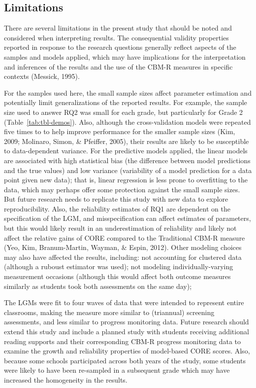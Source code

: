 \documentclass[
  english,
  man, fleqn, noextraspace]{apa6}
\begin{document}
\hypertarget{limitations}{%
\subsection{Limitations}\label{limitations}}

There are several limitations in the present study that should be noted and considered when interpreting results. The consequential validity properties reported in response to the research questions generally reflect aspects of the samples and models applied, which may have implications for the interpretation and inferences of the results and the use of the CBM-R measures in specific contexts (Messick, 1995).

For the samples used here, the small sample sizes affect parameter estimation and potentially limit generalizations of the reported results. For example, the sample size used to answer RQ2 was small for each grade, but particularly for Grade 2 (Table~\ref{tab:tbl-demos}). Also, although the cross-validation models were repeated five times to to help improve performance for the smaller sample sizes (Kim, 2009; Molinaro, Simon, \& Pfeiffer, 2005), their results are likely to be susceptible to data-dependent variance. For the predictive models applied, the linear models are associated with high statistical bias (the difference between model predictions and the true values) and low variance (variability of a model prediction for a data point given new data); that is, linear regression is less prone to overfitting to the data, which may perhaps offer some protection against the small sample sizes. But future research needs to replicate this study with new data to explore reproducibility. Also, the reliability estimates of RQ1 are dependent on the specification of the LGM, and misspecification can affect estimates of parameters, but this would likely result in an underestimation of reliability and likely not affect the relative gains of CORE compared to the Traditional CBM-R measure (Yeo, Kim, Branum-Martin, Wayman, \& Espin, 2012). Other modeling choices may also have affected the results, including: not accounting for clustered data (although a ruboust estimator was used); not modeling individually-varying measurement occasions (although this would affect both outcome measures similarly as students took both assessments on the same day);

The LGMs were fit to four waves of data that were intended to represent entire classrooms, making the measure more similar to (triannual) screening assessments, and less similar to progress monitoring data. Future research should extend this study and include a planned study with students receiving additional reading supports and their corresponding CBM-R progress monitoring data to examine the growth and reliability properties of model-based CORE scores. Also, because some schools participated across both years of the study, some students were likely to have been re-sampled in a subsequent grade which may have increased the homogeneity in the results.
\end{document}
